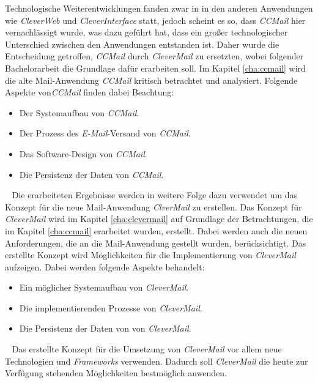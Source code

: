 Technologische Weiterentwicklungen fanden zwar in in den anderen Anwendungen wie \emph{CleverWeb} und \emph{CleverInterface} statt, jedoch scheint es so, dass \emph{CCMail} hier vernachlässigt wurde, was dazu geführt hat, dass ein großer technologischer Unterschied zwischen den Anwendungen entstanden ist. Daher wurde die Entscheidung getroffen, \emph{CCMail} durch \emph{CleverMail} zu ersetzten, wobei folgender Bachelorarbeit die Grundlage dafür erarbeiten soll.
\newline
\newline
Im Kapitel \ref{cha:ccmail} wird die alte Mail-Anwendung \emph{CCMail} kritisch betrachtet und analysiert. Folgende Aspekte von\emph{CCMail} finden dabei Beachtung:
\begin{itemize}
	\item Der Systemaufbau von \emph{CCMail}.
	\item Der Prozess des \emph{E-Mail}-Versand von \emph{CCMail}.
	\item Das Software-Design von \emph{CCMail}.
	\item Die Persistenz der Daten von \emph{CCMail}.
\end{itemize}
\ \newline
Die erarbeiteten Ergebnisse werden in weitere Folge dazu verwendet um das Konzept für die neue Mail-Anwendung \emph{ClverMail} zu erstellen. 
\newline
\newline
Das Konzept für \emph{CleverMail} wird im Kapitel \ref{cha:clevermail} auf Grundlage der Betrachtungen, die im Kapitel \ref{cha:ccmail} erarbeitet wurden, erstellt. Dabei werden auch die neuen Anforderungen, die an die Mail-Anwendung gestellt wurden, berücksichtigt. Das erstellte Konzept wird Möglichkeiten für die Implementierung von \emph{CleverMail} aufzeigen. Dabei werden folgende Aspekte behandelt:
\begin{itemize}
	\item Ein möglicher Systemaufbau von \emph{CleverMail}.
	\item Die implementierenden Prozesse von \emph{CleverMail}.
	\item Die Persistenz der Daten von von \emph{CleverMail}.
\end{itemize}
\ \newline
Das erstellte Konzept für die Umsetzung von \emph{CleverMail} vor allem neue Technologien und \emph{Frameworks} verwenden. Dadurch soll \emph{CleverMail} die heute zur Verfügung stehenden Möglichkeiten bestmöglich anwenden.